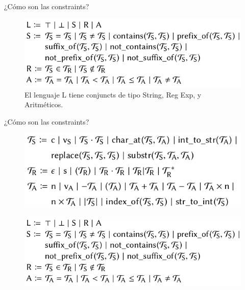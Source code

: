 \documentclass[10pt]{beamer}
\begin{document}
\begin{frame}{¿Cómo son las constraints?}
\begin{figure}[H]
\centering
    \includegraphics[scale=0.6]{figure3.png}
    \captionsetup{labelformat=empty}
    \caption{El lenguaje L tiene conjuncts de tipo String, Reg Exp, y Aritméticos.}
\end{figure}
\end{frame}

\begin{frame}{¿Cómo son las constraints?}
\begin{figure}[H]
\centering
    \includegraphics[scale=0.6]{figure2.png}
    \captionsetup{labelformat=empty}
\end{figure}
\begin{figure}[H]
\centering
    \includegraphics[scale=0.6]{figure3.png}
    \captionsetup{labelformat=empty}
\end{figure}

\end{frame}
\end{document}
